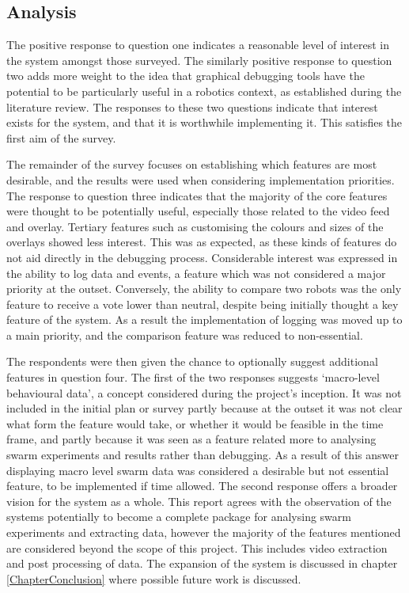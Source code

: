 
\subsection{Analysis}
The positive response to question one indicates a reasonable level of interest in the system amongst those surveyed. The similarly positive response to question two adds more weight to the idea that graphical debugging tools have the potential to be particularly useful in a robotics context, as established during the literature review. The responses to these two questions indicate that interest exists for the system, and that it is worthwhile implementing it. This satisfies the first aim of the survey.

The remainder of the survey focuses on establishing which features are most desirable, and the results were used when considering implementation priorities. The response to question three indicates that the majority of the core features were thought to be potentially useful, especially those related to the video feed and overlay. Tertiary features such as customising the colours and sizes of the overlays showed less interest. This was as expected, as these kinds of features do not aid directly in the debugging process. Considerable interest was expressed in the ability to log data and events, a feature which was not considered a major priority at the outset. Conversely, the ability to compare two robots was the only feature to receive a vote lower than neutral, despite being initially thought a key feature of the system. As a result the implementation of logging was moved up to a main priority, and the comparison feature was reduced to non-essential.

The respondents were then given the chance to optionally suggest additional features in question four. The first of the two responses suggests `macro-level behavioural data', a concept considered during the project's inception. It was not included in the initial plan or survey partly because at the outset it was not clear what form the feature would take, or whether it would be feasible in the time frame, and partly because it was seen as a feature related more to analysing swarm experiments and results rather than debugging. As a result of this answer displaying macro level swarm data was considered a desirable but not essential feature, to be implemented if time allowed. The second response offers a broader vision for the system as a whole. This report agrees with the observation of the systems potentially to become a complete package for analysing swarm experiments and extracting data, however the majority of the features mentioned are considered beyond the scope of this project. This includes video extraction and post processing of data. The expansion of the system is discussed in chapter \ref{ChapterConclusion} where possible future work is discussed.


